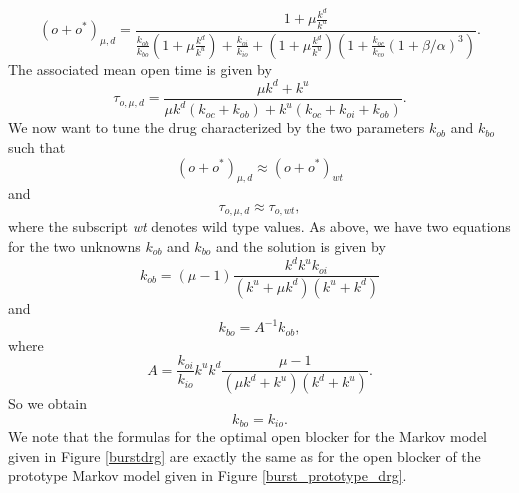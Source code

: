 \[
\left(  o+o^{\ast}\right)  _{\mu,d}=\frac{1+\mu\frac{k^{d}}{k^{u}}}%
{\frac{k_{ob}}{k_{bo}}\left(  1+\mu\frac{k^{d}}{k^{u}}\right)  +\frac{k_{oi}%
}{k_{io}}+\left(  1+\mu\frac{k^{d}}{k^{u}}\right)  \left(  1+\frac{k_{oc}%
}{k_{co}}\left(  1+\beta/\alpha\right)  ^{3}\right)  }.
\]
The associated mean open time is given by%
\begin{equation}
\tau_{o,\mu,d}=\frac{\mu k^{d}+k^{u}}{\mu k^{d}\left(  k_{oc}+k_{ob}\right)
+k^{u}\left(  k_{oc}+k_{oi}+k_{ob}\right)  }.
\end{equation}
We now want to tune the drug characterized by the two parameters $k_{ob}$
and $k_{bo}$ such that
\[
\left(  o+o^{\ast}\right)  _{\mu,d}\approx\left(  o+o^{\ast}\right)  _{wt}%
\]
and%
\[
\tau_{o,\mu,d}\approx\tau_{o,wt},%
\]
where the subscript {\it wt} denotes wild type values. As above, we have two equations
for the two unknowns  $k_{ob}$ and $k_{bo}$ and the solution is given by%
\begin{equation}
k_{ob}=\left(  \mu-1\right)  \frac{k^{d}k^{u}k_{oi}}{\left(  k^{u}+\mu
k^{d}\right)  \left(  k^{u}+k^{d}\right)  } \label{na_drug_ob}
\end{equation}
and%
\begin{equation}
k_{bo}=A^{-1}k_{ob},
\end{equation}
where%
\begin{equation}
A=\frac{k_{oi}}{k_{io}}k^{u}k^{d}\frac{\mu-1}{\left(  \mu k^{d}+k^{u}\right)
\left(  k^{d}+k^{u}\right)  }.
\end{equation}
So we obtain
\begin{equation}
k_{bo}=k_{io}. \label{na_drug_bo}
\end{equation}
We note that the formulas for the optimal open blocker for the Markov model
given in Figure \ref{burstdrg} are exactly the same as for the open blocker of the prototype Markov
model given in Figure \ref{burst_prototype_drg}.


